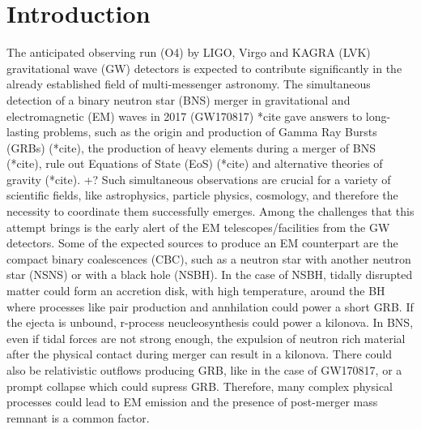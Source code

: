 \section{Introduction}

The anticipated observing run (O4) by LIGO, Virgo and KAGRA (LVK) gravitational wave (GW) detectors is expected to contribute significantly in the already established field of multi-messenger astronomy. The simultaneous detection of a binary neutron star (BNS) merger in gravitational and electromagnetic (EM) waves in 2017 (GW170817) *cite gave answers to long-lasting problems, such as the origin and production of Gamma Ray Bursts (GRBs) (*cite), the production of heavy elements during a merger of BNS (*cite), rule out Equations of State (EoS) (*cite) and alternative theories of gravity (*cite). +? Such simultaneous observations are crucial for a variety of scientific fields, like astrophysics, particle physics, cosmology, and therefore the necessity to coordinate them successfully emerges. Among the challenges that this attempt brings is the early alert of the EM telescopes/facilities from the GW detectors. Some of the expected sources to produce an EM counterpart are the compact binary coalescences (CBC), such as a neutron star with another neutron star (NSNS) or with a black hole (NSBH).
In the case of NSBH, tidally disrupted matter could form an accretion disk, with high temperature, around the BH where processes like pair production and annhilation could power a short GRB. If the ejecta is unbound, r-process neucleosynthesis could power a kilonova. In BNS, even if tidal forces are not strong enough, the expulsion of neutron rich material after the physical contact during merger can result in a kilonova. There could also be relativistic outflows producing GRB, like in the case of GW170817, or a prompt collapse which could supress GRB. Therefore, many complex physical processes could lead to EM emission and the presence of post-merger mass remnant is a common factor.

